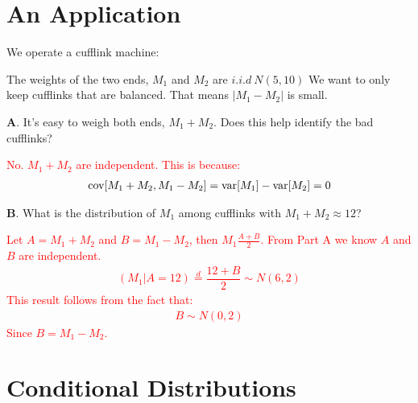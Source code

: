 \documentclass[../../../Master/AppliedStochastics.tex]{subfiles}
\author{Chandler}  %
\date{October 3}    %
\begin{document}
%


\makelecture %

\section{An Application}

We operate a cufflink machine:

\begin{center}
\end{center}

The weights of the two ends, $M_1$ and $M_2$ are $i.i.d\ N(5,10)$ 
We want to only keep cufflinks that are balanced. 
That means $\lvert M_{1} - M_{2} \rvert$ is small.

\textbf{A}. It's easy to weigh both ends, $M_{1}+M_{2}$. 
Does this help identify the bad cufflinks?

\textcolor{Red}{No. $M_{1}+M_{2}$ are independent. 
	This is because: 
	$$\begin{aligned}
	\operatorname{cov} [M_{1}+M_{2}, M_{1}-M_{2}] = \operatorname{var} [M_{1}]-\operatorname{var} [M_{2}] = 0
	\end{aligned}$$ }

\textbf{B}. What is the distribution of $M_{1}$ among cufflinks with $M_{1}+M_{2}\approx 12$? 

\textcolor{Red}{Let $A=M_{1}+M_{2}$ and $B=M_{1}-M_{2}$, then $M_{1}\frac{A+B}{2}$. 
From Part A we know $A$ and $B$ are independent. 
	$$\begin{aligned}
	(M_{1}\vert A=12) \stackrel{d}{=} \dfrac{12 + B}{2} \sim N(6,2)
	\end{aligned}$$
This result follows from the fact that: 
	$$\begin{aligned}
	B \sim N(0,2)
	\end{aligned}$$ 
Since $B=M_{1}-M_{2}$.
}


\section{Conditional Distributions}
\end{document}
